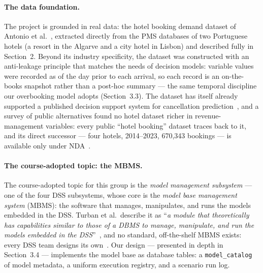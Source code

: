 \paragraph{The data foundation.}
The project is grounded in real data: the hotel booking demand dataset of Antonio et al.~\cite{antonio2019}, extracted directly from the PMS databases of two Portuguese hotels (a resort in the Algarve and a city hotel in Lisbon) and described fully in Section~2. Beyond its industry specificity, the dataset was constructed with an anti-leakage principle that matches the needs of decision models: variable values were recorded as of the day prior to each arrival, so each record is an on-the-books snapshot rather than a post-hoc summary --- the same temporal discipline our overbooking model adopts (Section~3.3).
The dataset has itself already supported a published decision support system for cancellation prediction~\cite{antonio2019dss}, and a survey of public alternatives found no hotel dataset richer in revenue-management variables: every public ``hotel booking'' dataset traces back to it, and its direct successor --- four hotels, 2014--2023, 670{,}343 bookings --- is available only under NDA~\cite{silvestre2025}.

\paragraph{The course-adopted topic: the MBMS.}
The course-adopted topic for this group is the \emph{model management subsystem} --- one of the four DSS subsystems, whose core is the \emph{model base management system} (MBMS): the software that manages, manipulates, and runs the models embedded in the DSS. Turban et al.~describe it as ``\emph{a module that theoretically has capabilities similar to those of a DBMS to manage, manipulate, and run the models embedded in the DSS}''~\cite{turban2011}, and no standard, off-the-shelf MBMS exists: every DSS team designs its own~\cite{turban2011}. Our design --- presented in depth in Section~3.4 --- implements the model base as database tables: a \texttt{model\_catalog} of model metadata, a uniform execution registry, and a scenario run log.
